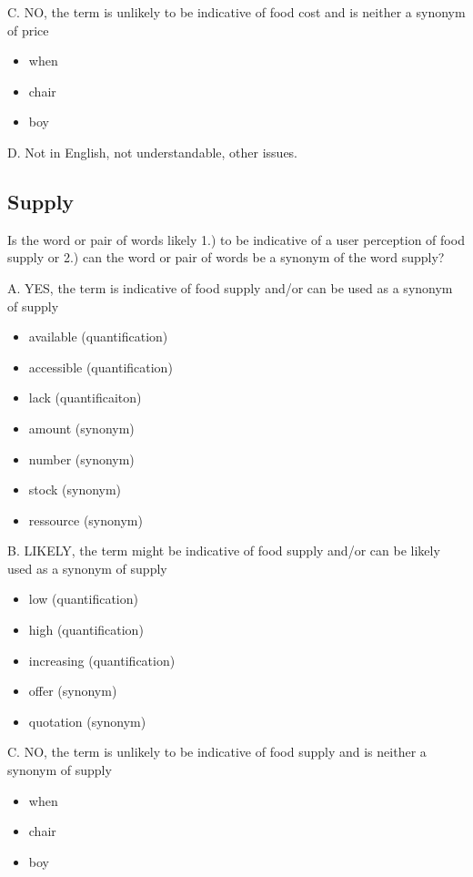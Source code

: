 C. NO, the term is unlikely to be indicative of food cost and is neither a synonym of price

\begin{itemize}
  \item when
  \item chair
  \item boy
 
\end{itemize}


D. Not in English, not understandable, other issues.


\subsection{Supply}

Is the word or pair of words likely 1.) to be indicative of a user perception of food supply or 2.) can the word or pair of words be a synonym of the word supply?



A. YES, the term is indicative of food supply and/or can be used as a synonym of supply


\begin{itemize}
  \item available (quantification)
  \item accessible (quantification)
    \item lack (quantificaiton)
  \item amount (synonym)
  \item number (synonym)
   \item stock (synonym)
   \item ressource (synonym)
\end{itemize}

B. LIKELY, the term might be indicative of food supply and/or can be likely used as a synonym of supply

\begin{itemize}
  \item low (quantification)
  \item high (quantification)
  \item increasing (quantification)
  \item offer (synonym)
  \item quotation (synonym)
\end{itemize}

C. NO, the term is unlikely to be indicative of food supply and is neither a synonym of supply

\begin{itemize}
  \item when
  \item chair
  \item boy
\end{itemize}

